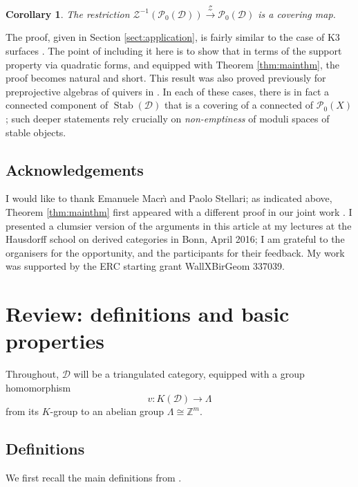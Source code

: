 \documentclass[leqno,11pt,twoside]{amsart}
\makeatletter
\newtheorem*{rep@theorem}{{Conjecture} \ref##}
\newtheorem{Cor}[Thm]{Corollary}
{\newenvironment{rep{Cor}}[1]{ } \begin{rep@theorem}} \end{rep@theorem}}
\theoremstyle{definition}
\makeatother
\begin{document}
\begin{Cor}
\label{cor:P0covering}
The restriction
$ {\ensuremath{\mathcal Z}}^{-1}\left({\ensuremath{\mathcal P}}_0({\ensuremath{\mathcal D}})\right) \xrightarrow{\ensuremath{\mathcal Z}} {\ensuremath{\mathcal P}}_0({\ensuremath{\mathcal D}}) $
is a covering map.
\end{Cor}
The proof, given in Section \ref{sect:application}, is fairly similar to the case of
K3 surfaces \cite[Proposition 8.3]{Bridgeland:K3}.
The point of including it here is
to show that in terms of the support property via quadratic forms, and equipped with Theorem
\ref{thm:mainthm}, the proof becomes natural and short.
This result was also proved previously for preprojective algebras of
quivers in \cite{Thomas:stability, Bridgeland:ADE, Ikeda:stability-preprojective}. In each of these
cases, there is in fact a connected component of ${\mathop{\mathrm{Stab}}\nolimits}({\ensuremath{\mathcal D}})$ that is a covering of a connected of
${\ensuremath{\mathcal P}}_0(X)$; such deeper statements rely crucially on \emph{non-emptiness} of moduli spaces
of stable objects.

\subsection*{Acknowledgements}
I would like to thank Emanuele Macr{\`{\i}} and Paolo Stellari; as indicated above, Theorem
\ref{thm:mainthm} first appeared with a different proof in our joint work \cite{BMS:stabCY3s}. 
I presented a clumsier version of the arguments in this article at my lectures
at the Hausdorff school  on derived categories in Bonn, April 2016;
I am grateful to the organisers for the opportunity, and the participants for their
feedback.
My work was supported by the ERC starting grant WallXBirGeom 337039.

\section{Review: definitions and basic properties}
\label{sect:review}

Throughout, ${\ensuremath{\mathcal D}}$ will be a triangulated category, equipped with a group homomorphism
\[ v \colon K({\ensuremath{\mathcal D}}) \to \Lambda \]
from its $K$-group to an abelian group $\Lambda \cong {\ensuremath{\mathbb{Z}}}^m$.

\subsection*{Definitions}
We first recall the main definitions from \cite{Bridgeland:Stab}.
\end{document}
